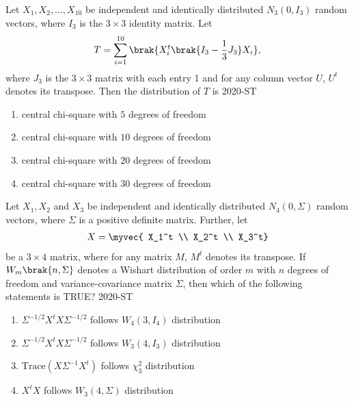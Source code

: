 \item Let $X_1, X_2, \dots, X_{10}$ be independent and identically distributed $N_3(0, I_3)$ random vectors, where $I_3$ is the $3 \times 3$ identity matrix. Let
\begin{align*}
T = \sum_{i=1}^{10} \brak{ X_i^t \brak{ I_3 - \frac{1}{3} J_3 } X_i},
\end{align*}
where $J_3$ is the $3 \times 3$ matrix with each entry 1 and for any column vector $U$, $U^t$ denotes its transpose. Then the distribution of $T$ is
\hfill{2020-ST}
\begin{enumerate}
    \item central chi-square with $5$ degrees of freedom
    \item central chi-square with $10$ degrees of freedom
    \item central chi-square with $20$ degrees of freedom
    \item central chi-square with $30$ degrees of freedom
\end{enumerate}

\item Let $X_1, X_2$ and $X_3$ be independent and identically distributed $N_4(0, \Sigma)$ random vectors, where $\Sigma$ is a positive definite matrix. Further, let 
\begin{align*}
X = \myvec{ X_1^t \\ X_2^t \\ X_3^t}
\end{align*}
be a $3 \times 4$ matrix, where for any matrix $M$, $M^t$ denotes its transpose. If $W_m\brak{n, \Sigma}$ denotes a Wishart distribution of order $m$ with $n$ degrees of freedom and variance-covariance matrix $\Sigma$, then which of the following statements is TRUE?
\hfill{2020-ST}
\begin{enumerate}
    \item $\Sigma^{-1/2} X^t X \Sigma^{-1/2}$ follows $W_4(3, I_4)$ distribution
    \item $\Sigma^{-1/2} X^t X \Sigma^{-1/2}$ follows $W_3(4, I_3)$ distribution
    \item $\text{Trace} (X \Sigma^{-1} X^t)$ follows $\chi^2_3$ distribution
    \item $X^t X$ follows $W_3(4, \Sigma)$ distribution
\end{enumerate}

